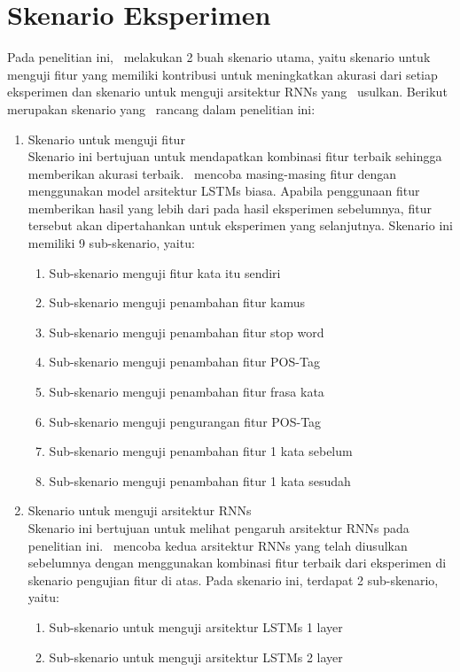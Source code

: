 \section{Skenario Eksperimen}
Pada penelitian ini, \saya~melakukan 2 buah skenario utama, yaitu skenario untuk menguji fitur yang memiliki kontribusi untuk meningkatkan akurasi dari setiap eksperimen dan skenario untuk menguji arsitektur RNNs yang \saya~usulkan. Berikut merupakan skenario yang \saya~rancang dalam penelitian ini:
\begin{enumerate}
	\item Skenario untuk menguji fitur\\
	Skenario ini bertujuan untuk mendapatkan kombinasi fitur terbaik sehingga memberikan akurasi terbaik. \Saya~mencoba masing-masing fitur dengan menggunakan model arsitektur LSTMs biasa. Apabila penggunaan fitur memberikan hasil yang lebih dari pada hasil eksperimen sebelumnya, fitur tersebut akan dipertahankan untuk eksperimen yang selanjutnya. Skenario ini memiliki 9 sub-skenario, yaitu:
	\begin{enumerate}
		\item Sub-skenario menguji fitur kata itu sendiri
		\item Sub-skenario menguji penambahan fitur kamus
		\item Sub-skenario menguji penambahan fitur stop word
		\item Sub-skenario menguji penambahan fitur POS-Tag
		\item Sub-skenario menguji penambahan fitur frasa kata
		\item Sub-skenario menguji pengurangan fitur POS-Tag
		\item Sub-skenario menguji penambahan fitur 1 kata sebelum
		\item Sub-skenario menguji penambahan fitur 1 kata sesudah
	\end{enumerate}
	\item Skenario untuk menguji arsitektur RNNs\\
	Skenario ini bertujuan untuk melihat pengaruh arsitektur RNNs pada penelitian ini. \Saya~mencoba kedua arsitektur RNNs yang telah diusulkan sebelumnya dengan menggunakan kombinasi fitur terbaik dari eksperimen di skenario pengujian fitur di atas. Pada skenario ini, terdapat 2 sub-skenario, yaitu:
	\begin{enumerate}
		\item Sub-skenario untuk menguji arsitektur LSTMs 1 layer
		\item Sub-skenario untuk menguji arsitektur LSTMs 2 layer
	\end{enumerate}
	
\end{enumerate}

